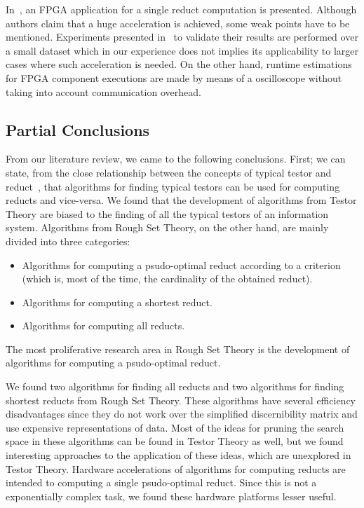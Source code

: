 \documentclass[authoryear,11pt]{elsarticle}
\begin{document}
  In~\citep{Grzes13,Kopczynski14}, an FPGA application for a single reduct computation is presented. Although
  authors claim that a huge acceleration is achieved, some weak points have to be mentioned. Experiments presented 
  in~\citep{Kopczynski14} to validate their results are performed over a small dataset which in our experience 
  does not implies its applicability to larger cases where such acceleration is needed. On the other hand, 
  runtime estimations for FPGA component executions are made by means of a oscilloscope without taking into 
  account communication overhead.
  
\subsection{Partial Conclusions}

  From our literature review, we came to the following conclusions. First; we can state, from the close
  relationship between the concepts of typical testor and reduct~\citep{Lazo15}, that algorithms for finding
  typical testors can be used for computing reducts and vice-versa. We found that the development of algorithms
  from Testor Theory are biased to the finding of all the typical testors of an information system. Algorithms
  from Rough Set Theory, on the other hand, are mainly divided into three categories:
  \begin{itemize}
	  \item Algorithms for computing a psudo-optimal reduct according to a criterion (which is, most of the 
	  		time, the cardinality of the obtained reduct).
	  \item Algorithms for computing	a shortest reduct.
	  \item Algorithms for computing	all reducts.
  \end{itemize}
  The most proliferative research area in Rough Set Theory is the development of algorithms for computing a 
  psudo-optimal reduct. 
  
  We found two algorithms for finding all reducts and two algorithms for finding shortest reducts from Rough 
  Set Theory. These algorithms have several efficiency disadvantages since they do not work over the simplified
  discernibility matrix and use expensive representations of data. Most of the ideas for pruning the search
  space in these algorithms can be found in Testor Theory as well, but we found interesting approaches to the
  application of these ideas, which are unexplored in Testor Theory. Hardware accelerations of algorithms for
  computing reducts are intended to computing a single psudo-optimal reduct. Since this is not a exponentially
  complex task, we found these hardware platforms lesser useful.
  
\end{document}
